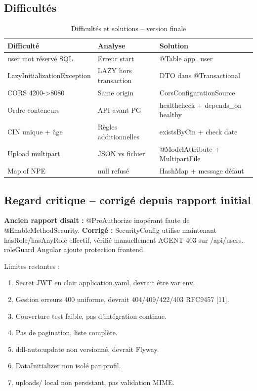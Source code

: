 \documentclass[a4paper,12pt]{article}
\newcommand{\refbib}[1]{[#1]}
\begin{document}
\subsection{Difficultés}
\begin{table}[htbp]
\centering
\caption{Difficultés et solutions -- version finale}
\label{tab:diff}
\small
\begin{tabularx}{\linewidth}{@{}L{3.5cm} X L{3.4cm}@{}}
\toprule
\textbf{Difficulté} & \textbf{Analyse} & \textbf{Solution} \\
\midrule
user mot réservé SQL & Erreur start & @Table app\_user \\
LazyInitializationException & LAZY hors transaction & DTO dans @Transactional \\
CORS 4200->8080 & Same origin & CorsConfigurationSource \\
Ordre conteneurs & API avant PG & healthcheck + depends\_on healthy \\
CIN unique + âge & Règles additionnelles & existsByCin + check date \\
Upload multipart & JSON vs fichier & @ModelAttribute + MultipartFile \\
Map.of NPE & null refusé & HashMap + message défaut \\
\bottomrule
\end{tabularx}
\end{table}

\subsection{Regard critique -- corrigé depuis rapport initial}
\textbf{Ancien rapport disait :} @PreAuthorize inopérant faute de @EnableMethodSecurity. \textbf{Corrigé :} SecurityConfig utilise maintenant hasRole/hasAnyRole effectif, vérifié manuellement AGENT 403 sur /api/users. roleGuard Angular ajoute protection frontend.

Limites restantes :
\begin{enumerate}[label=\textbf{\arabic*.},leftmargin=*,itemsep=6pt]
\item Secret JWT en clair application.yaml, devrait être var env.
\item Gestion erreurs 400 uniforme, devrait 404/409/422/403 RFC9457 \refbib{11}.
\item Couverture test faible, pas d'intégration continue.
\item Pas de pagination, liste complète.
\item ddl-auto:update non versionné, devrait Flyway.
\item DataInitializer non isolé par profil.
\item uploads/ local non persistant, pas validation MIME.
\end{enumerate}
\end{document}
